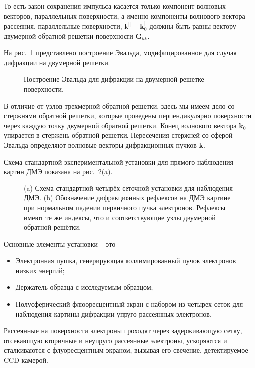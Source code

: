 То есть закон сохранения импульса касается только компонент волновых
векторов, параллельных поверхности, а именно компоненты волнового
вектора рассеяния, параллельные поверхности, $\textbf{k}^{||}-\textbf{k}^{||}_0$ 
должны быть равны вектору двумерной обратной решетки поверхности $\textbf{G}_{hk}$.


На рис.~\ref{pic:evald} представлено построение Эвальда, модифицированное для случая
дифракции на двумерной решетки.
\begin{figure}[!ht]
\caption{Построение Эвальда для дифракции на двумерной решетке 
поверхности.}
\label{pic:evald}
\end{figure}
В отличие от узлов трехмерной обратной решетки, здесь мы имеем дело 
со стержнями обратной решетки, которые проведены перпендикулярно 
поверхности через каждую точку двумерной обратной решетки.
Конец волнового вектора $\textbf{k}_0$ упирается в стержень обратной 
решетки. Пересечения стержней со сферой Эвальда определяют волновые 
векторы дифракционных пучков $\textbf{k}$.


Схема стандартной экспериментальной установки для прямого наблюдения
картин ДМЭ показана на рис.~\ref{pic:LEED_setup}(a).
	\begin{figure}[!ht]
		\caption{(a) Схема стандартной четырёх-сеточной установки для 
		наблюдения ДМЭ. (b) Обозначение дифракционных рефлексов на ДМЭ 
		картине при нормальном падении первичного пучка электронов. Рефлексы 
		имеют те же индексы, что и соответствующие узлы двумерной обратной 
		решётки.}
		\label{pic:LEED_setup}
	\end{figure}
Основные элементы установки -- это
	\vspace{15pt}
		\begin{itemize}
			\item Электронная пушка, генерирующая коллимированный пучок 
			электронов низких энергий;
			\item Держатель образца с исследуемым образцом;
			\item Полусферический флюоресцентный экран с набором из четырех 
			сеток для наблюдения картины дифракции упруго рассеянных электронов.
		\end{itemize} 
	\vspace{15pt}
Рассеянные на поверхности электроны проходят через задерживающую сетку,
отсекающую вторичные и неупруго рассеянные электроны, ускоряются и 
сталкиваются с флуоресцентным экраном, вызывая его свечение, 
детектируемое CCD-камерой.


